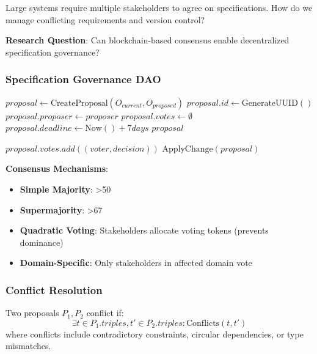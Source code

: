 Large systems require multiple stakeholders to agree on specifications. How do we manage conflicting requirements and version control?

\textbf{Research Question}: Can blockchain-based consensus enable decentralized specification governance?

\subsubsection{Specification Governance DAO}

\begin{algorithm}
\caption{DAO-Based Specification Governance}
\begin{algorithmic}[1]
    \State $proposal \gets \text{CreateProposal}(O_{current}, O_{proposed})$
    \State $proposal.id \gets \text{GenerateUUID}()$
    \State $proposal.proposer \gets proposer$
    \State $proposal.votes \gets \emptyset$
    \State $proposal.deadline \gets \text{Now}() + 7 days$
    \State \Return $proposal$
\EndProcedure

        \State $proposal.votes.add((voter, decision))$
            \State $\text{ApplyChange}(proposal)$
        \EndIf
    \EndIf
\EndProcedure
\end{algorithmic}
\end{algorithm}

\textbf{Consensus Mechanisms}:
\begin{itemize}
    \item \textbf{Simple Majority}: >50%
    \item \textbf{Supermajority}: >67%
    \item \textbf{Quadratic Voting}: Stakeholders allocate voting tokens (prevents dominance)
    \item \textbf{Domain-Specific}: Only stakeholders in affected domain vote
\end{itemize}

\subsubsection{Conflict Resolution}

\begin{definition}
    Two proposals $P_1, P_2$ conflict if:
    \begin{equation}
        \exists t \in P_1.triples, t' \in P_2.triples : \text{Conflicts}(t, t')
    \end{equation}
    where conflicts include contradictory constraints, circular dependencies, or type mismatches.
\end{definition}

